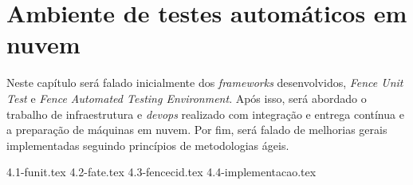 \chapter{Ambiente de testes automáticos em nuvem}\label{cap_solucao}

Neste capítulo será falado inicialmente dos \emph{frameworks} desenvolvidos, \emph{Fence Unit Test} e \emph{Fence Automated Testing Environment}. Após isso, será abordado o trabalho de infraestrutura e \emph{devops} realizado com integração e entrega contínua e a preparação de máquinas em nuvem. Por fim, será falado de melhorias gerais implementadas seguindo princípios de metodologias ágeis.

{4.1-funit.tex}
{4.2-fate.tex}
{4.3-fencecid.tex}
{4.4-implementacao.tex}